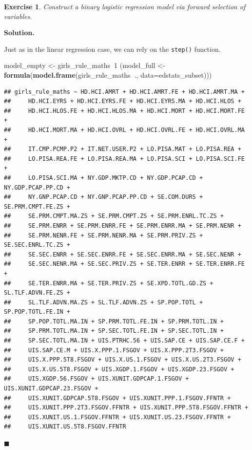 \documentclass[10pt,b5paper,krantz1]{krantz}
\newenvironment{Shaded}{\begin{snugshade}}{\end{snugshade}}
\newcommand{\DataTypeTok}[1]{\textcolor[rgb]{0.27,0.27,0.27}{#1}}
\newcommand{\DecValTok}[1]{\textcolor[rgb]{0.06,0.06,0.06}{#1}}
\newcommand{\KeywordTok}[1]{\textcolor[rgb]{0.27,0.27,0.27}{\textbf{#1}}}
\newcommand{\NormalTok}[1]{#1}
\newcommand{\OperatorTok}[1]{\textcolor[rgb]{0.43,0.43,0.43}{\textbf{#1}}}
\newcommand{\StringTok}[1]{\textcolor[rgb]{0.5,0.5,0.5}{#1}}
\newtheorem{exercise}{Exercise}[chapter]
\newenvironment{solution}{%
\bigskip\noindent\textbf{Solution. }%
\it\ignorespaces%
\ignorespaces%
}{\ignorespaces%
\hfill$\blacksquare$%
}
\begin{document}
\begin{exercise}

Construct a binary logistic regression model via forward selection
of variables.

\end{exercise}

\begin{solution}

Just as in the linear regression case, we can rely on the \texttt{step()} function.

\begin{Shaded}
\begin{Highlighting}[]
\NormalTok{model_empty <-}\StringTok{ }\NormalTok{girls_rule_maths}\OperatorTok{~}\DecValTok{1}
\NormalTok{(model_full <-}\StringTok{ }\KeywordTok{formula}\NormalTok{(}\KeywordTok{model.frame}\NormalTok{(girls_rule_maths}\OperatorTok{~}\NormalTok{.,}
    \DataTypeTok{data=}\NormalTok{edstats_subset)))}
\end{Highlighting}
\end{Shaded}

\begin{verbatim}
## girls_rule_maths ~ HD.HCI.AMRT + HD.HCI.AMRT.FE + HD.HCI.AMRT.MA + 
##     HD.HCI.EYRS + HD.HCI.EYRS.FE + HD.HCI.EYRS.MA + HD.HCI.HLOS + 
##     HD.HCI.HLOS.FE + HD.HCI.HLOS.MA + HD.HCI.MORT + HD.HCI.MORT.FE + 
##     HD.HCI.MORT.MA + HD.HCI.OVRL + HD.HCI.OVRL.FE + HD.HCI.OVRL.MA + 
##     IT.CMP.PCMP.P2 + IT.NET.USER.P2 + LO.PISA.MAT + LO.PISA.REA + 
##     LO.PISA.REA.FE + LO.PISA.REA.MA + LO.PISA.SCI + LO.PISA.SCI.FE + 
##     LO.PISA.SCI.MA + NY.GDP.MKTP.CD + NY.GDP.PCAP.CD + NY.GDP.PCAP.PP.CD + 
##     NY.GNP.PCAP.CD + NY.GNP.PCAP.PP.CD + SE.COM.DURS + SE.PRM.CMPT.FE.ZS + 
##     SE.PRM.CMPT.MA.ZS + SE.PRM.CMPT.ZS + SE.PRM.ENRL.TC.ZS + 
##     SE.PRM.ENRR + SE.PRM.ENRR.FE + SE.PRM.ENRR.MA + SE.PRM.NENR + 
##     SE.PRM.NENR.FE + SE.PRM.NENR.MA + SE.PRM.PRIV.ZS + SE.SEC.ENRL.TC.ZS + 
##     SE.SEC.ENRR + SE.SEC.ENRR.FE + SE.SEC.ENRR.MA + SE.SEC.NENR + 
##     SE.SEC.NENR.MA + SE.SEC.PRIV.ZS + SE.TER.ENRR + SE.TER.ENRR.FE + 
##     SE.TER.ENRR.MA + SE.TER.PRIV.ZS + SE.XPD.TOTL.GD.ZS + SL.TLF.ADVN.FE.ZS + 
##     SL.TLF.ADVN.MA.ZS + SL.TLF.ADVN.ZS + SP.POP.TOTL + SP.POP.TOTL.FE.IN + 
##     SP.POP.TOTL.MA.IN + SP.PRM.TOTL.FE.IN + SP.PRM.TOTL.IN + 
##     SP.PRM.TOTL.MA.IN + SP.SEC.TOTL.FE.IN + SP.SEC.TOTL.IN + 
##     SP.SEC.TOTL.MA.IN + UIS.PTRHC.56 + UIS.SAP.CE + UIS.SAP.CE.F + 
##     UIS.SAP.CE.M + UIS.X.PPP.1.FSGOV + UIS.X.PPP.2T3.FSGOV + 
##     UIS.X.PPP.5T8.FSGOV + UIS.X.US.1.FSGOV + UIS.X.US.2T3.FSGOV + 
##     UIS.X.US.5T8.FSGOV + UIS.XGDP.1.FSGOV + UIS.XGDP.23.FSGOV + 
##     UIS.XGDP.56.FSGOV + UIS.XUNIT.GDPCAP.1.FSGOV + UIS.XUNIT.GDPCAP.23.FSGOV + 
##     UIS.XUNIT.GDPCAP.5T8.FSGOV + UIS.XUNIT.PPP.1.FSGOV.FFNTR + 
##     UIS.XUNIT.PPP.2T3.FSGOV.FFNTR + UIS.XUNIT.PPP.5T8.FSGOV.FFNTR + 
##     UIS.XUNIT.US.1.FSGOV.FFNTR + UIS.XUNIT.US.23.FSGOV.FFNTR + 
##     UIS.XUNIT.US.5T8.FSGOV.FFNTR
\end{verbatim}


\end{solution}
\end{document}

